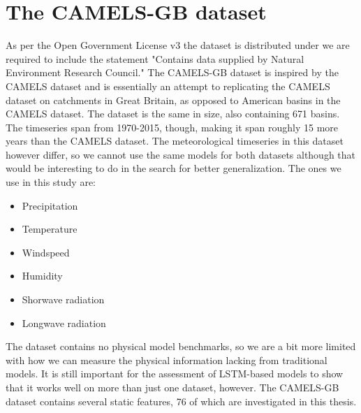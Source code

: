 \section{The CAMELS-GB dataset}
As per the Open Government License v3 the dataset is distributed under we are required 
to include the statement "Contains data supplied by Natural Environment Research Council."
The CAMELS-GB dataset \citep{CAMELS_GB} is inspired by the CAMELS dataset and is 
essentially an attempt to replicating the CAMELS dataset on catchments in Great Britain, 
as opposed to American basins in the CAMELS dataset. The dataset is the same in size,
also containing 671 basins. The timeseries span from 1970-2015, though, making 
it span roughly 15 more years than the CAMELS dataset.
 The meteorological timeseries 
in this dataset however differ, so we cannot use the same models for both datasets
although that would be interesting to do in the search for better generalization.
The ones we use in this study are:
\begin{itemize}
    \item Precipitation
    \item Temperature
    \item Windspeed
    \item Humidity
    \item Shorwave radiation
    \item Longwave radiation
\end{itemize}
The dataset contains no physical model benchmarks, so we are a bit more limited 
with how we can measure the physical information lacking from traditional models.
It is still important for the assessment of LSTM-based models to show that it works
well on more than just one dataset, however. 
The CAMELS-GB dataset contains several static features, 76 of which are investigated
in this thesis.
